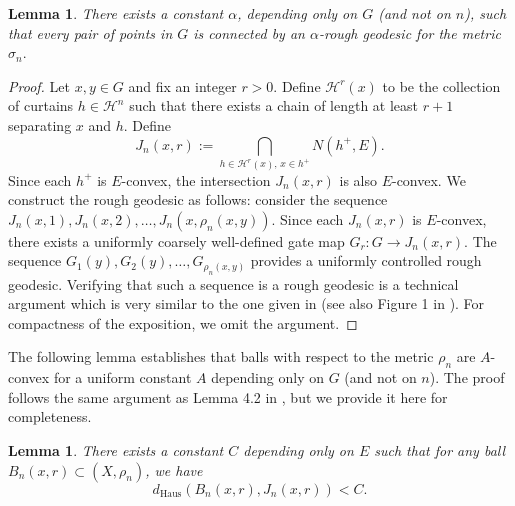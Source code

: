 \documentclass{amsart}
\numberwithin{thm}{section}
\numberwithin{figure}{section}
\newtheorem{lem}[thm]{Lemma}
\theoremstyle{definition}
\theoremstyle{definition}
\theoremstyle{remark}
\numberwithin{equation}{section}
\theoremstyle{plain}
\begin{document}
\begin{lem} 
There exists a constant $\alpha$, depending only on $G$ (and not on $n$), such that every pair of points in $G$ is connected by an $\alpha$-rough geodesic for the metric $\sigma_n.$
\label{lem:rhon_geodesic}
\end{lem}

\begin{proof} 
Let $x, y \in G$ and fix an integer $r > 0$. Define $\mathcal{H}^r(x)$ to be the collection of curtains $h \in \mathcal{H}^n$ such that there exists a chain of length at least $r+1$ separating $x$ and $h$. Define 
\[
J_n(x,r) := \bigcap_{h \in \mathcal{H}^r(x), \, x \in h^+} N(h^+,E).
\]
Since each $h^+$ is  $E$-convex, the intersection $J_n(x,r)$ is also $E$-convex. We construct the rough geodesic as follows: consider the sequence $J_n(x,1), J_n(x,2), \dots, J_n(x,\rho_n(x,y)).$ Since each $J_n(x,r)$ is $E$-convex, there exists a uniformly coarsely well-defined gate map $G_r: G \to J_n(x,r)$. The sequence $G_1(y), G_2(y), \dots, G_{\rho_n(x,y)}$ provides a uniformly controlled rough geodesic. Verifying that such a sequence is a rough geodesic is a technical argument which is very similar to the one given in \cite[Proposition~4.6]{PetytZalloum24} (see also Figure 1 in \cite[Figure~1]{PetytZalloum24}). For compactness of the exposition, we omit the argument. 
\end{proof}

The following lemma establishes that balls with respect to the metric $\rho_n$ are $A$-convex for a uniform constant $A$ depending only on $G$ (and not on $n$). The proof follows the same argument as Lemma 4.2 in \cite{PetytZalloum24}, but we provide it here for completeness.

\begin{lem} 
There exists a constant $C$ depending only on $E$ such that for any ball $B_n(x,r) \subset (X,\rho_n)$, we have
\[
d_{\text{Haus}}(B_n(x,r), J_n(x,r)) < C.
\]
\end{lem}
\end{document}
